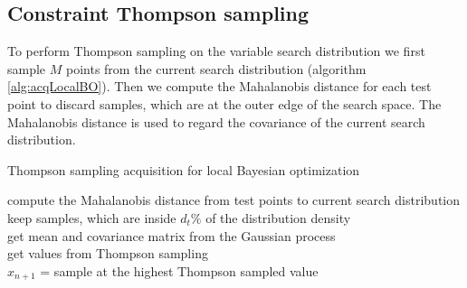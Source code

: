 %


\subsection{Constraint Thompson sampling}

To perform Thompson sampling on the variable search distribution we first sample $M$ points from the current search distribution (algorithm \ref{alg:acqLocalBO}). Then we compute the Mahalanobis distance for each test point to discard samples, which are at the outer edge of the search space. The Mahalanobis distance is used to regard the covariance of the current search distribution.

\begin{algorithm}
    \caption{Thompson sampling acquisition for local Bayesian optimization\label{alg:acqLocalBO}}
    \BlankLine

    compute the Mahalanobis distance from test points to current search distribution\\
    keep samples, which are inside $d_t\%$ of the distribution density\\
    get mean and covariance matrix from the Gaussian process\\
    get values from Thompson sampling\\
    $x_{n+1}$ = sample at the highest Thompson sampled value\\
\end{algorithm}

